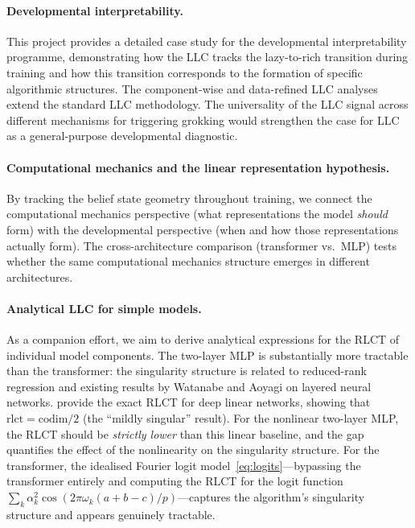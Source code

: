 \documentclass[11pt,a4paper]{article}
\begin{document}
\paragraph{Developmental interpretability.} This project provides a detailed case study for the developmental interpretability programme, demonstrating how the LLC tracks the lazy-to-rich transition during training and how this transition corresponds to the formation of specific algorithmic structures. The component-wise and data-refined LLC analyses extend the standard LLC methodology. The universality of the LLC signal across different mechanisms for triggering grokking would strengthen the case for LLC as a general-purpose developmental diagnostic.

\paragraph{Computational mechanics and the linear representation hypothesis.} By tracking the belief state geometry throughout training, we connect the computational mechanics perspective (what representations the model \emph{should} form) with the developmental perspective (when and how those representations actually form). The cross-architecture comparison (transformer vs.\ MLP) tests whether the same computational mechanics structure emerges in different architectures.

\paragraph{Analytical LLC for simple models.} As a companion effort, we aim to derive analytical expressions for the RLCT of individual model components. The two-layer MLP is substantially more tractable than the transformer: the singularity structure is related to reduced-rank regression and existing results by Watanabe and Aoyagi on layered neural networks. \citet{pepinlehalleur2025geometry} provide the exact RLCT for deep linear networks, showing that $\mathrm{rlct} = \mathrm{codim}/2$ (the ``mildly singular'' result). For the nonlinear two-layer MLP, the RLCT should be \emph{strictly lower} than this linear baseline, and the gap quantifies the effect of the nonlinearity on the singularity structure. For the transformer, the idealised Fourier logit model~\eqref{eq:logits}---bypassing the transformer entirely and computing the RLCT for the logit function $\sum_k \alpha_k^2 \cos(2\pi\omega_k(a+b-c)/p)$---captures the algorithm's singularity structure and appears genuinely tractable.
\end{document}
